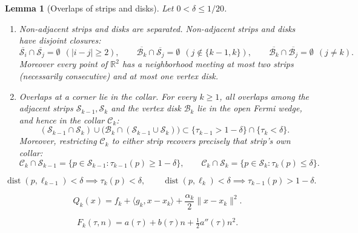 \documentclass[10pt,a4paper]{amsart}
\newtheorem{lemma}{Lemma}
\newcommand{\R}{\mathbb{R}}
\newcommand{\ip}[2]{\langle #1,#2\rangle}
\begin{document}
\begin{lemma}[Overlaps of strips and disks]
\label{lem:seam}
Let $0 < \delta \le 1/20$.
\begin{enumerate}
\item[(i)] \emph{Non-adjacent strips and disks are separated.}
Non-adjacent strips and disks have disjoint closures:
\[
\overline{\mathcal S_i} \cap \overline{\mathcal S_j} = \emptyset \ \ (|i-j| \ge 2), \qquad
\overline{\mathcal B_k} \cap \overline{\mathcal S_j} = \emptyset \ \ (j \notin \{k-1, k\}), \qquad
\overline{\mathcal B_k} \cap \overline{\mathcal B_j} = \emptyset \ \ (j \ne k).
\]
Moreover every point of $\R^2$ has a neighborhood meeting at most two strips (necessarily consecutive) and at most one vertex disk.
\item[(ii)] \emph{Overlaps at a corner lie in the collar.}
For every $k \ge 1$, all overlaps among the adjacent strips $\mathcal S_{k-1}, \mathcal S_k$ and the vertex disk $\mathcal B_k$ lie in the open Fermi wedge, and hence in the collar $\mathcal C_k$:
\begin{equation}
\label{eq:cornerincl}
(\mathcal S_{k-1} \cap \mathcal S_k) \cup \bigl(\mathcal B_k \cap (\mathcal S_{k-1} \cup \mathcal S_k)\bigr) \subset \{\tau_{k-1}>1-\delta\}\cap\{\tau_k<\delta\}.
\end{equation}
Moreover, restricting $\mathcal C_k$ to either strip recovers precisely that strip's own collar:
\begin{equation}
\label{eq:Ckrest}
\mathcal C_k \cap \mathcal S_{k-1} = \{p \in \mathcal S_{k-1} : \tau_{k-1}(p) \ge 1-\delta\}, \qquad
\mathcal C_k \cap \mathcal S_k = \{p \in \mathcal S_k : \tau_k(p) \le \delta\}.
\end{equation}
\end{enumerate}
\end{lemma}

\begin{equation}
\label{eq:corner}
\operatorname{dist}(p, \ell_{k-1}) < \delta \implies \tau_k(p) < \delta,
\qquad
\operatorname{dist}(p, \ell_k) < \delta \implies \tau_{k-1}(p) > 1-\delta.
\end{equation}

\begin{equation}
\label{eq:Qk}
Q_k(x) = f_k + \ip{g_k}{x-x_k} + \frac{\alpha_k}{2}\|x-x_k\|^2.
\end{equation}

\begin{equation}
\label{eq:template}
F_k(\tau, n) = a(\tau) + b(\tau)n + \tfrac12 a''(\tau)n^2.
\end{equation}
\end{document}
